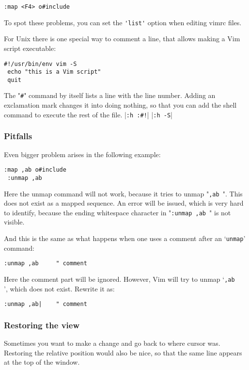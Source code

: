 \begin{Verbatim}[samepage=true]
 :map <F4> o#include
\end{Verbatim}

To spot these problems, you can set the \verb!'list'! option when editing vimrc files.

For Unix there is one special way to comment a line, that allows making a Vim script executable:

\begin{Verbatim}[samepage=true]
 #!/usr/bin/env vim -S
 echo "this is a Vim script"
 quit
\end{Verbatim}

The "\verb!#!" command by itself lists a line with the line number.
Adding an exclamation mark changes it into doing nothing, so that you can add the shell command to execute the rest of the file. |\verb_:h :#!_| |\verb!:h -S!|

\subsubsection{Pitfalls}
Even bigger problem arises in the following example:

\begin{Verbatim}[samepage=true]
 :map ,ab o#include
 :unmap ,ab
\end{Verbatim}

Here the unmap command will not work, because it tries to unmap "\verb!,ab !".
This does not exist as a mapped sequence.
An error will be issued, which is very hard to identify, because the ending whitespace character in "\verb!:unmap ,ab !" is not visible.

And this is the same as what happens when one uses a comment after an `\verb!unmap!' command:

\begin{Verbatim}[samepage=true]
 :unmap ,ab     " comment
\end{Verbatim}

Here the comment part will be ignored.
However, Vim will try to unmap `\verb!,ab     !', which does not exist.
Rewrite it as:

\begin{Verbatim}[samepage=true]
 :unmap ,ab|    " comment
\end{Verbatim}

\subsubsection{Restoring the view}
Sometimes you want to make a change and go back to where cursor was.
Restoring the relative position would also be nice, so that the same line appears at the top of the window.

